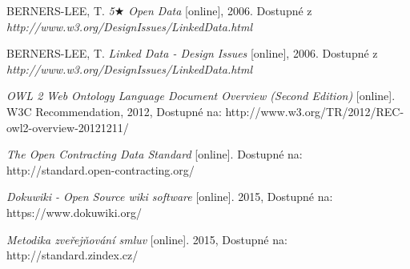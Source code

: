 \begin{thebibliography}{99}
  BERNERS-LEE, T.
  \emph{5$\bigstar$ Open Data}
  [online], 2006. Dostupné z 
  \emph{http://www.w3.org/DesignIssues/LinkedData.html}  
  
  BERNERS-LEE, T.
  \emph{Linked Data - Design Issues}
  [online], 2006. Dostupné z 
  \emph{http://www.w3.org/DesignIssues/LinkedData.html}  
  
  \emph{OWL 2 Web Ontology Language Document Overview (Second Edition)} 
  [online]. W3C Recommendation, 2012, Dostupné na: 
  http://www.w3.org/TR/2012/REC-owl2-overview-20121211/

  \emph{The Open Contracting Data Standard} 
  [online]. Dostupné na: 
  http://standard.open-contracting.org/
  
  \emph{Dokuwiki - Open Source wiki software} 
  [online]. 2015, Dostupné na: 
  https://www.dokuwiki.org/
  
  \emph{Metodika zveřejňování smluv} 
  [online]. 2015, Dostupné na: 
  http://standard.zindex.cz/

\end{thebibliography}
